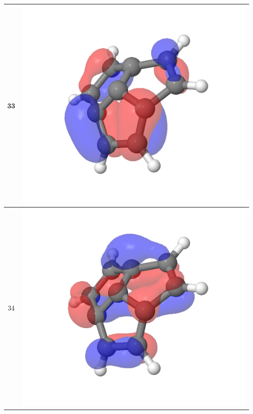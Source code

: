 \documentclass{article}
\begin{document}
\begin{tabular}{|c|c|}
33 & \includegraphics[scale=0.3]{M1S_33.png}\\ \hline
34 & \includegraphics[scale=0.3]{M1S_34.png}\\ \hline

\end{tabular}
\end{document}
